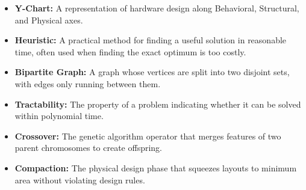 \documentclass[12pt,a4paper]{article}
\begin{document}
\begin{tcolorbox}[defbox, title={\textbf{One-Line Definitions}}]
\begin{itemize}[leftmargin=*, itemsep=3pt, topsep=0pt]
  \item \textbf{Y-Chart:} A representation of hardware design along Behavioral, Structural, and Physical axes.
  \item \textbf{Heuristic:} A practical method for finding a useful solution in reasonable time, often used when finding the exact optimum is too costly.
  \item \textbf{Bipartite Graph:} A graph whose vertices are split into two disjoint sets, with edges only running between them.
  \item \textbf{Tractability:} The property of a problem indicating whether it can be solved within polynomial time.
  \item \textbf{Crossover:} The genetic algorithm operator that merges features of two parent chromosomes to create offspring.
  \item \textbf{Compaction:} The physical design phase that squeezes layouts to minimum area without violating design rules.
\end{itemize}
\end{tcolorbox}

\vspace{6pt}
\end{document}
